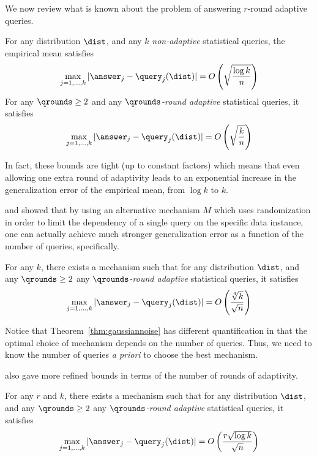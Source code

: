 We now review what is known about the problem of answering $r$-round adaptive queries.  
\begin{thm} 
\label{thm:nonadapt-adapt}
For any distribution $\dist$, and any $k$ \emph{non-adaptive} statistical queries, the empirical mean satisfies
$$
\max_{j=1,\dots,k} | \answer_j - \query_j(\dist) | = O\left( \sqrt{\frac{\log k}{n}}  \right)
$$
For any $\qrounds \geq 2$ and any \emph{$\qrounds$-round adaptive} statistical queries, it satisfies
$$
\max_{j=1,\dots,k} | \answer_j - \query_j(\dist) | = O\left( \sqrt{\frac{k}{n}}  \right)
$$
\end{thm}
In fact, these bounds are tight (up to constant factors) which means that even allowing one extra round of adaptivity leads to an exponential increase in the generalization error of the empirical mean, from $\log k$ to $k$.

\citet{DworkFHPRR15} and \citet{BassilyNSSSU16} showed that by using an alternative mechanism $M$ which uses randomization in order to limit the dependency of a single query on the specific data instance, one 
can actually achieve much stronger generalization error as a function of the number of queries, specifically.
\begin{thm} \label{thm:gaussiannoise} For any $k$, there exists a mechanism such that for any distribution $\dist$, and any $\qrounds \geq 2$ any \emph{$\qrounds$-round adaptive} statistical queries, it satisfies
$$
\max_{j=1,\dots,k} | \answer_j - \query_j(\dist) | = O\left( \frac{\sqrt[4]{k}}{\sqrt{n}}  \right)
$$
\end{thm}
Notice that Theorem~\ref{thm:gaussiannoise} has different quantification in that the optimal choice of mechanism depends on the number of queries.  Thus, we need to know the number of queries \emph{a priori} to choose the best mechanism.


\citet{DworkFHPRR15}
also gave more refined bounds in terms of the number of rounds of adaptivity.   %
\begin{thm} \label{thm:gaussiannoise2} For any $r$ and $k$, there exists a mechanism such that for any distribution $\dist$, and any $\qrounds \geq 2$ any \emph{$\qrounds$-round adaptive} statistical queries, it satisfies
$$
\max_{j=1,\dots,k} | \answer_j - \query_j(\dist) | = O\left( \frac{r \sqrt{\log k}}{\sqrt{n}}  \right)
$$
\end{thm}

